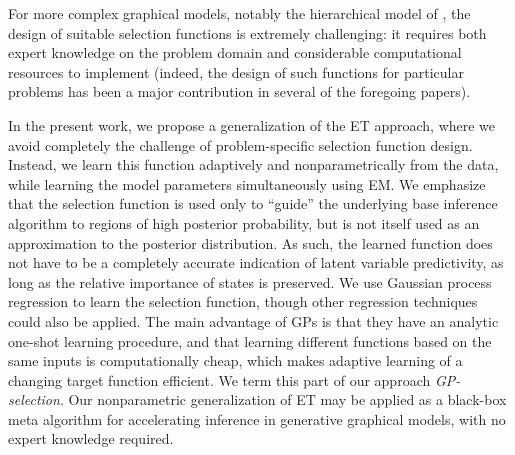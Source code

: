 For more complex graphical models, notably the hierarchical model of \citep{DaiLucke2014},  the design of suitable selection functions
is extremely challenging: it requires both expert knowledge
on the problem domain and considerable computational resources to implement
 (indeed, the design of such functions for  particular problems
has been a major contribution in several of the foregoing papers).

In the present work, we propose a generalization of the ET approach, where
we avoid completely the challenge of problem-specific selection function design.
Instead,
we learn this function  adaptively and nonparametrically
from the data,
 while learning the model
parameters  simultaneously using EM.
We emphasize that the selection function is  used only to ``guide'' the underlying
base inference algorithm to regions of high posterior probability, but is not itself
used as an approximation to the posterior distribution. As such, the learned
function does not have to be a completely accurate indication of latent
variable predictivity,
as long as the relative importance of states is preserved.
We use  Gaussian process
regression \citep{RasmussenGPbook} to learn the selection function, though other regression techniques could
also be applied. The main advantage of GPs
is that they have an analytic one-shot learning procedure, and that learning different
functions based on the same inputs is computationally cheap, which makes adaptive learning
of a changing target function efficient. We term this part of our approach
\textit{GP-selection}.
Our nonparametric generalization of  ET may be applied as a black-box
meta algorithm for accelerating inference in  generative graphical models,
with no expert knowledge required.






